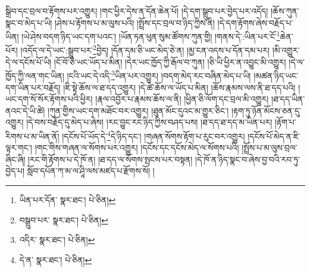 སྒྲིབ་དང་བྲལ་བ་རྟོགས་པར་འགྱུར། །གང་ཕྱིར་དེས་ན་དོན་ཆེན་པོ། །དེ་དག་སྒྲུབ་པར་བྱེད་པར་འདོད། །ཆོས་ཀུན་སྣང་བ་མེད་པ་ཡི། །ཤེས་པ་རྟོགས་པ་མ་ལུས་པའི། །སྤྲོས་དང་བྲལ་བ་ཉིད་ཀྱིས་ནི། །དེ་དག་རྟོགས་ཞེས་བརྗོད་པ་ཡིན། །ཡེ་ཤེས་བདག་ཉིད་ཡང་དག་པའང་། །ཡོན་ཏན་ཕུན་སུམ་ཚོགས་ཀུན་གྱི། །གནས་དེ་:ཡིན་པར་ངོ་\footnote{ཡིན་པར་དོན་  སྣར་ཐང་།  པེ་ཅིན། }ཆེན་པོར། །འདོད་ལ་དེ་ཡང་:སྒྲུབ་པར་\footnote{བསྒྲུབ་པར་  སྣར་ཐང་།  པེ་ཅིན། }བྱེད། །དོན་དམ་ཅི་ཡང་མེད་ཅེ་ན། །མྱ་ངན་འདས་པ་དོན་དམ་པར། །མི་འགྱུར་དེ་ལ་དངོས་པོ་ཡི། །ངོ་བོ་ཅི་ཡང་ཡོད་པ་མིན། །དེར་ཡང་ཁྱོད་ཀྱི་རྒོལ་བ་ཀུན། །ཅི་ཡི་ཕྱིར་ན་འབྱུང་མི་འགྱུར། །དེ་ལ་ཁྱོད་ཀྱི་ལན་གང་ཡིན། །ངའི་ཡང་དེ་འདི་\footnote{འདིར་  སྣར་ཐང་།  པེ་ཅིན། }ཡིན་པར་འགྱུར། །བདག་མེད་རང་བཞིན་མེད་པ་ཡི། །མཚན་ཉིད་ཡང་དག་ཡིན་པར་བརྗོད། །ཇི་སྟེ་ཆོས་ལ་ཐ་དད་འགྱུར། །དེ་ཚེ་ཆོས་ལ་ཡོད་པ་མིན། །ཆོས་རྣམས་ལས་ནི་ཐ་དད་པའི། །ཡང་དག་སོ་སོར་རྟོགས་པའི་ཕྱིར། །རྣལ་འབྱོར་པ་རྣམས་ཆོས་ལ་ནི། །ཕྱིན་ཅི་ལོག་དང་བྲལ་མི་འགྱུར། །ཐ་དད་ཡིན་ནའང་དེ་ཡི་ཚེ། །ཀུན་གྱིས་ཡང་དག་མཐོང་བར་འགྱུར། །ཐུན་མོང་དུའང་མ་གྱུར་ཅིང་། །རྟག་ཏུ་ཉོན་མོངས་ཅན་དུ་འགྱུར། །དེ་བས་བརྗོད་དུ་མེད་པ་ཞེས། །རང་བྱུང་རང་ཉིད་ཀྱིས་བཤད་པས། །ཐ་དད་ཐ་དད་མ་ཡིན་པར། །རྟོག་པ་རིགས་པ་མ་ཡིན་ནོ། །དངོས་པོ་ཡོད་དེ་\footnote{དེ་ན་  སྣར་ཐང་།  པེ་ཅིན། }དེ་ཉིད་དང་། །གཞན་སོགས་རྟོག་པ་རུང་བར་འགྱུར། །དངོས་པོ་མེད་ན་ཇི་ལྟར་གང་། །གང་གིས་གཞན་ལ་སོགས་པར་འགྱུར། །དངོས་དང་དངོས་མེད་ལ་སོགས་པའི། །སྤྲོས་པ་མ་ལུས་བྲལ་ཞིང་ཞི། །རང་གི་རྟོགས་པ་དེ་ཁོ་ན། །ཐ་དད་ལ་སོགས་སྤངས་པར་བསྟན། །དེ་ཁོ་ན་ཉིད་སྣང་བ་ཞེས་བྱ་བའི་རབ་ཏུ་བྱེད་པ། སློབ་དཔོན་ཀ་མ་ལ་ཤཱི་ལས་མཛད་པ་རྫོགས་སོ། ། 